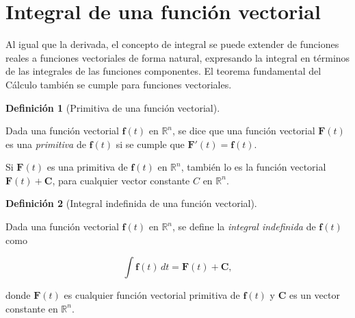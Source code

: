 \documentclass[
  a4paper,
]{scrreport}
\theoremstyle{definition}
\theoremstyle{plain}
\theoremstyle{definition}
\newtheorem{definition}{Definición}[chapter]
\theoremstyle{definition}
\theoremstyle{plain}
\theoremstyle{plain}
\theoremstyle{remark}
\begin{document}
\section{Integral de una función
vectorial}\label{integral-de-una-funciuxf3n-vectorial}

Al igual que la derivada, el concepto de integral se puede extender de
funciones reales a funciones vectoriales de forma natural, expresando la
integral en términos de las integrales de las funciones componentes. El
teorema fundamental del Cálculo también se cumple para funciones
vectoriales.

\begin{definition}[Primitiva de una función
vectorial]\protect\hypertarget{def-primitiva-funcion-vectorial}{}\label{def-primitiva-funcion-vectorial}

Dada una función vectorial \(\mathbf{f}(t)\) en \(\mathbb{R}^n\), se
dice que una función vectorial \(\mathbf{F}(t)\) es una \emph{primitiva}
de \(\mathbf{f}(t)\) si se cumple que
\(\mathbf{F}'(t) = \mathbf{f}(t)\).

\end{definition}

\begin{tcolorbox}[enhanced jigsaw, leftrule=.75mm, colbacktitle=quarto-callout-note-color!10!white, toprule=.15mm, opacityback=0, opacitybacktitle=0.6, toptitle=1mm, breakable, bottomtitle=1mm, colframe=quarto-callout-note-color-frame, rightrule=.15mm, titlerule=0mm, title=\textcolor{quarto-callout-note-color}{\faInfo}\hspace{0.5em}{Observación}, arc=.35mm, left=2mm, bottomrule=.15mm, colback=white, coltitle=black]

Si \(\mathbf{F}(t)\) es una primitiva de \(\mathbf{f}(t)\) en
\(\mathbb{R}^n\), también lo es la función vectorial
\(\mathbf{F}(t)+\mathbf{C}\), para cualquier vector constante \(C\) en
\(\mathbb{R}^n\).

\end{tcolorbox}

\begin{definition}[Integral indefinida de una función
vectorial]\protect\hypertarget{def-integral-indefinida-funcion-vectorial}{}\label{def-integral-indefinida-funcion-vectorial}

Dada una función vectorial \(\mathbf{f}(t)\) en \(\mathbb{R}^n\), se
define la \emph{integral indefinida} de \(\mathbf{f}(t)\) como

\[
\int \mathbf{f}(t)\, dt = \mathbf{F}(t) + \mathbf{C},
\]

donde \(\mathbf{F}(t)\) es cualquier función vectorial primitiva de
\(\mathbf{f}(t)\) y \(\mathbf{C}\) es un vector constante en
\(\mathbb{R}^n\).

\end{definition}
\end{document}
